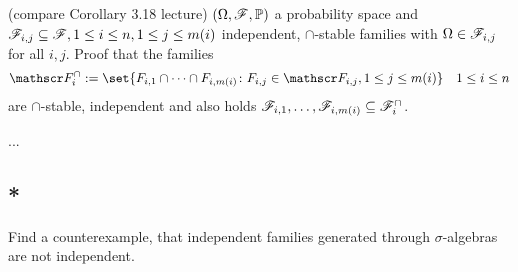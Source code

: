 \subsection{}(compare Corollary 3.18 lecture)
$(\Omega, \mathscr{F}, \mathbb{P})$ a probability space and $\mathscr{F}_{i,j} \subseteq \mathscr{F}, 1 \le i \le n, 1 \le j \le m(i)$ independent, $\cap$-stable families with $\Omega \in \mathscr{F}_{i,j}$ for all $i,j$. Proof that the families
\begin{align*}
	\F_i^{\cap} := \set{F_{i,1} \cap \cdots \cap F_{i, m(i)} \colon F_{i,j} \in \F_{i,j}, 1 \le j \le m(i)} \quad 1 \le i \le n
\end{align*}
are $\cap$-stable, independent and also holds $\mathscr{F}_{i,1},\dots, \mathscr{F}_{i,m(i)} \subseteq \mathscr{F}_i^{\cap}$.

\begin{solution}
	...
\end{solution}
\subsection{*}
Find a counterexample, that independent families generated through $\sigma$-algebras are not independent.